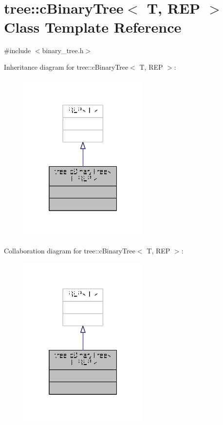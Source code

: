 \hypertarget{classtree_1_1cBinaryTree}{\section{tree\-:\-:c\-Binary\-Tree$<$ T, R\-E\-P $>$ Class Template Reference}
\label{classtree_1_1cBinaryTree}
}


{\ttfamily \#include $<$binary\-\_\-tree.\-h$>$}



Inheritance diagram for tree\-:\-:c\-Binary\-Tree$<$ T, R\-E\-P $>$\-:
\nopagebreak
\begin{figure}[H]
\begin{center}
\leavevmode
\includegraphics[width=184pt]{classtree_1_1cBinaryTree__inherit__graph}
\end{center}
\end{figure}


Collaboration diagram for tree\-:\-:c\-Binary\-Tree$<$ T, R\-E\-P $>$\-:
\nopagebreak
\begin{figure}[H]
\begin{center}
\leavevmode
\includegraphics[width=184pt]{classtree_1_1cBinaryTree__coll__graph}
\end{center}
\end{figure}


